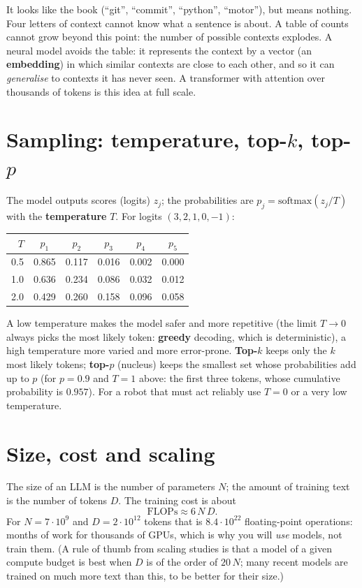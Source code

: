 It looks like the book (``git'', ``commit'', ``python'', ``motor''), but means nothing. Four letters of context cannot know what a sentence is about. A table of counts cannot grow beyond this point: the number of possible contexts explodes. A neural model avoids the table: it represents the context by a vector (an \textbf{embedding}) in which similar contexts are close to each other, and so it can \emph{generalise} to contexts it has never seen. A transformer with attention over thousands of tokens is this idea at full scale.

\section*{Sampling: temperature, top-$k$, top-$p$}
The model outputs scores (logits) $z_j$; the probabilities are $p_j=\mathrm{softmax}(z_j/T)$ with the \textbf{temperature} $T$. For logits $(3,2,1,0,-1)$:
\begin{center}
\renewcommand{\arraystretch}{1.2}
\begin{tabular}{r|ccccc}
$T$ & $p_1$ & $p_2$ & $p_3$ & $p_4$ & $p_5$\\ \hline
0.5 & 0.865 & 0.117 & 0.016 & 0.002 & 0.000\\
1.0 & 0.636 & 0.234 & 0.086 & 0.032 & 0.012\\
2.0 & 0.429 & 0.260 & 0.158 & 0.096 & 0.058\\
\end{tabular}
\end{center}
A low temperature makes the model safer and more repetitive (the limit $T\to0$ always picks the most likely token: \textbf{greedy} decoding, which is deterministic), a high temperature more varied and more error-prone. \textbf{Top-$k$} keeps only the $k$ most likely tokens; \textbf{top-$p$} (nucleus) keeps the smallest set whose probabilities add up to $p$ (for $p=0.9$ and $T=1$ above: the first three tokens, whose cumulative probability is $0.957$). For a robot that must act reliably use $T=0$ or a very low temperature.

\section*{Size, cost and scaling}
The size of an LLM is the number of parameters $N$; the amount of training text is the number of tokens $D$. The training cost is about
\[
\text{FLOPs}\approx6\,N\,D.
\]
For $N=7\cdot10^{9}$ and $D=2\cdot10^{12}$ tokens that is $8.4\cdot10^{22}$ floating-point operations: months of work for thousands of GPUs, which is why you will \emph{use} models, not train them. (A rule of thumb from scaling studies is that a model of a given compute budget is best when $D$ is of the order of $20\,N$; many recent models are trained on much more text than this, to be better for their size.)

